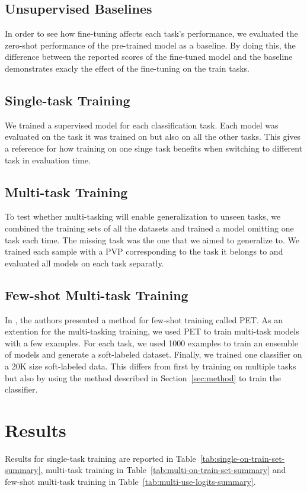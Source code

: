 \documentclass[11pt,a4paper]{article}
\begin{document}
\subsection{Unsupervised Baselines}
In order to see how fine-tuning affects each task's performance, we evaluated the zero-shot performance of the pre-trained model as a baseline.
By doing this, the difference between the reported scores of the fine-tuned model and the baseline demonstrates exacly the effect of the fine-tuning on the train tasks.

\subsection{Single-task Training}
We trained a supervised model for each classification task.
Each model was evaluated on the task it was trained on but also on all the other tasks.
This gives a reference for how training on one singe task benefits when switching to different task in evaluation time.

\subsection{Multi-task Training}
To test whether multi-tasking will enable generalization to unseen tasks, we combined the training sets of all the datasets and trained a model omitting one task each time.
The missing task was the one that we aimed to generalize to.
We trained each sample with a PVP corresponding to the task it belongs to and evaluated all models on each task separatly.

\subsection{Few-shot Multi-task Training}
In \citet{schick2020exploiting}, the authors presented a method for few-shot training called PET.
As an extention for the multi-tasking training, we used PET to train multi-task models with a few examples.
For each task, we used 1000 examples to train an ensemble of models and generate a soft-labeled dataset.
Finally, we trained one classifier on a 20K size soft-labeled data.
This differs from \citet{schick2020exploiting} first by training on multiple tasks but also by using the method described in Section~\ref{sec:method} to train the classifier.

\section{Results}
Results for single-task training are reported in Table~\ref{tab:single-on-train-set-summary},
multi-task training in Table~\ref{tab:multi-on-train-set-summary}
and few-shot multi-task training in Table~\ref{tab:multi-use-logits-summary}.
\end{document}
